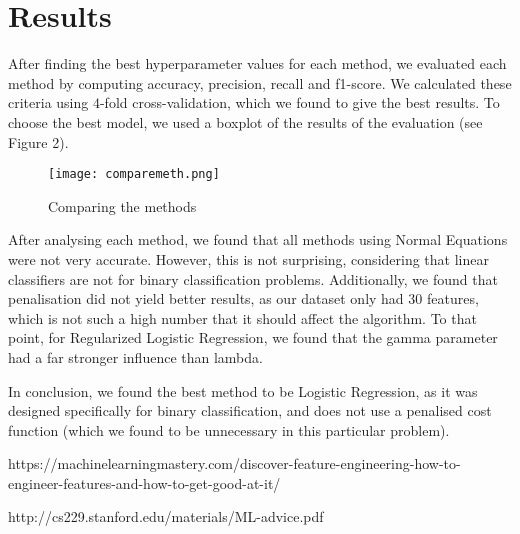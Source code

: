 \documentclass{article}
\begin{document}
	\section{Results}
	After finding the best hyperparameter values for each method, we evaluated each method by computing accuracy, precision, recall and f1-score. We calculated these criteria using $4$-fold cross-validation, which we found to give the best results. To choose the best model, we used a boxplot of the results of the evaluation (see Figure 2).

	\begin{figure}[h]
		\centering
		\texttt{[image: comparemeth.png]}
		\caption{Comparing the methods}
	\end{figure}

	After analysing each method, we found that all methods using Normal Equations were not very accurate. However, this is not surprising, considering that linear classifiers are not for binary classification problems. Additionally, we found that penalisation did not yield better results, as our dataset only had $30$ features, which is not such a high number that it should affect the algorithm. To that point, for Regularized Logistic Regression, we found that the gamma parameter had a far stronger influence than lambda.

	In conclusion, we found the best method to be Logistic Regression, as it was designed specifically for binary classification, and does not use a penalised cost function (which we found to be unnecessary in this particular problem).

	\begin{thebibliography}{9}
		 https://machinelearningmastery.com/discover-feature-engineering-how-to-engineer-features-and-how-to-get-good-at-it/

		 http://cs229.stanford.edu/materials/ML-advice.pdf
	\end{thebibliography}
\end{document}
